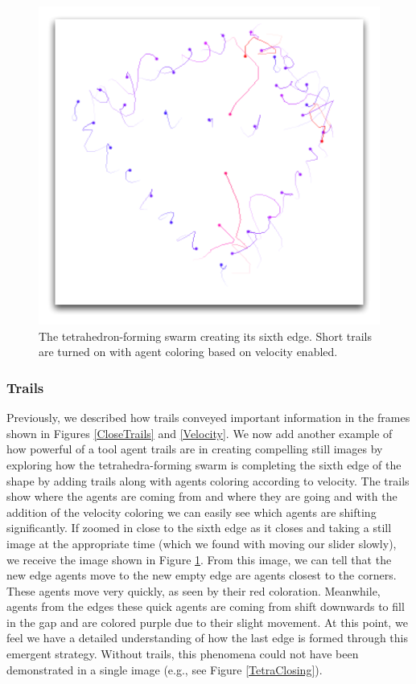\documentclass[conference]{IEEEtran}
\begin{document}
\begin{figure}
\centering
\includegraphics[scale=.55]{images/tetrastrategy.pdf}
\caption{
The tetrahedron-forming swarm creating its sixth edge. Short trails are turned on with agent coloring based on velocity enabled.
}
\label{TetraStrategy}
\end{figure}

\subsubsection{Trails}
Previously, we described how trails conveyed important information in the frames shown in
Figures \ref{CloseTrails} and \ref{Velocity}.
We now add another example of how powerful of a tool agent trails are in creating compelling still images by
exploring how the tetrahedra-forming swarm is completing the sixth edge of the shape by
adding trails along with agents coloring according to velocity.
The trails show where the agents are coming from and where they are going and
with the addition of the velocity coloring we can easily see which agents are shifting significantly.
If zoomed in close to the sixth edge as it closes and taking a still image at the appropriate time (which we found
with moving our slider slowly), we receive the image shown in Figure \ref{TetraStrategy}.
From this image, we can tell that the new edge agents move to the new empty edge are agents closest to the corners.
These agents move very quickly, as seen by their red coloration.
Meanwhile, agents from the edges these quick agents are coming from shift downwards to fill in the gap and are colored
purple due to their slight movement.
At this point, we feel we have a detailed understanding of how the last edge is formed through this emergent strategy.
Without trails, this phenomena could not have been demonstrated in a single image (e.g., see Figure \ref{TetraClosing}).
\end{document}
